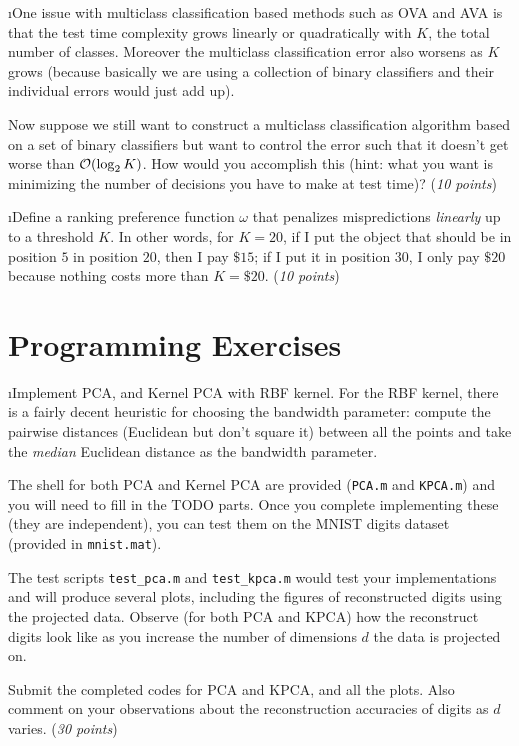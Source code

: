 \documentclass[fleqn]{article}
\begin{document}
\i One issue with multiclass classification based methods such as OVA
and AVA is that the test time complexity grows 
linearly or quadratically with $K$, the total number of classes. Moreover
the multiclass classification error also worsens as $K$ grows (because
basically we are using a collection of binary classifiers and their individual
errors would just add up). 

Now suppose we still want to construct a multiclass classification algorithm
based on a set of binary classifiers but want to control the error such that
it doesn't get worse than $\mathcal{O}(\log_2 K)$. How would you accomplish this (hint:
what you want is minimizing the number of decisions you have to make at test time)?
(\emph{10 points})

\i Define a ranking preference function $\omega$ that penalizes
mispredictions \emph{linearly} up to a threshold $K$.  In other
words, for $K=20$, if I put the object that should be in position
$5$ in position $20$, then I pay $\$15$; if I put it in position
$30$, I only pay $\$20$ because nothing costs more than $K=\$20$.
(\emph{10 points})

\ene

\section{Programming Exercises}

\bee

\i Implement PCA, and Kernel PCA with RBF kernel. For the RBF kernel,
there is a fairly decent heuristic for choosing the bandwidth parameter: 
compute the pairwise distances (Euclidean but don't square it) between all 
the points and take the \emph{median} Euclidean distance as the bandwidth
parameter. 

The shell for both PCA and Kernel PCA are provided ({\tt PCA.m} and 
{\tt KPCA.m}) and you will need to fill in the TODO parts. 
Once you complete implementing these (they are independent), you can test them
on the MNIST digits dataset (provided in {\tt mnist.mat}).

The test scripts {\tt test\_pca.m} and {\tt test\_kpca.m} would test your
implementations and will produce several plots, including the figures of 
reconstructed digits using the projected data. Observe (for both
PCA and KPCA) how the reconstruct digits look like as you increase 
the number of dimensions $d$ the data is projected on.

Submit the completed codes for PCA and KPCA, and all the plots. Also comment on your
observations about the reconstruction accuracies of digits as $d$ varies.
(\emph{30 points})
\end{document}
